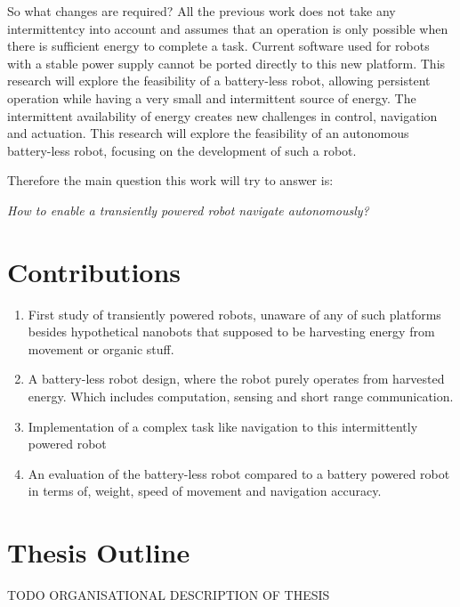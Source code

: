 
So what changes are required?
All the previous work does not take any intermittentcy into account and assumes that an operation is only possible when there is sufficient energy to complete a task.
Current software used for robots with a stable power supply cannot be ported directly to this new platform.
This research will explore the feasibility of a battery-less robot, allowing persistent operation while having a very small and intermittent source of energy.
The intermittent availability of energy creates new challenges in control, navigation and actuation. 
This research will explore the feasibility of an autonomous battery-less robot, focusing on the development of such a robot.


Therefore the main question this work will try to answer is:

\begin{center}
	\textit{How to enable a transiently powered robot navigate autonomously?}
\end{center}

\section{Contributions}

\begin{enumerate}

\item First study of transiently powered robots, unaware of any of such platforms besides hypothetical nanobots that supposed to be harvesting energy from movement or organic stuff.

\item A battery-less robot design, where the robot purely operates from harvested energy. Which includes computation, sensing and short range communication.

\item Implementation of a complex task like navigation to this intermittently powered robot

\item An evaluation of the battery-less robot compared to a battery powered robot in terms of, weight, speed of movement and navigation accuracy.
\end{enumerate}


\section{Thesis Outline}


\vspace{1\baselineskip}

\noindent
TODO ORGANISATIONAL DESCRIPTION OF THESIS

